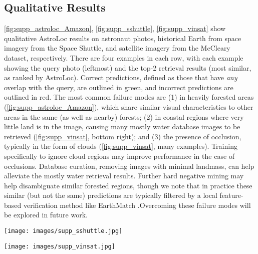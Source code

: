 \subsection{Qualitative Results}
\label{sec:supp_qualitatives}
\cref{fig:supp_astroloc_Amazon}, \ref{fig:supp_sshuttle}, \ref{fig:supp_vinsat} show qualitative AstroLoc results on astronaut photos, historical Earth from space imagery from the Space Shuttle, and satellite imagery from the McCleary\cite{McCleary_2024_vinsat} dataset, respectively. There are four examples in each row, with each example showing the query photo (leftmost) and the top-2 retrieval results (\ie most similar, as ranked by AstroLoc). Correct predictions, defined as those that have \textit{any} overlap with the query, are outlined in green, and incorrect predictions are outlined in red. 
The most common failure modes are (1) in heavily forested areas (\cref{fig:supp_astroloc_Amazon}), which share similar visual characteristics to other areas in the same (as well as nearby) forests; (2) in coastal regions where very little land is in the image, causing many mostly water database images to be retrieved (\cref{fig:supp_vinsat}, bottom right); and (3) the presence of occlusion, typically in the form of clouds (\cref{fig:supp_vinsat}, many examples). Training specifically to ignore cloud regions may improve performance in the case of occlusions. Database curation, removing images with minimal landmass, can help alleviate the mostly water retrieval results. Further hard negative mining may help disambiguate similar forested regions, though we note that in practice these similar (but not the same) predictions are typically filtered by a local feature-based verification method like EarthMatch \cite{Berton_2024_EarthMatch}.Overcoming these failure modes will be explored in future work.


\begin{figure*}
    \begin{center}
    \texttt{[image: images/supp\_sshuttle.jpg]}
    \end{center}
    \caption{\textbf{Qualitative examples from the historical Space Shuttle imagery.} Each triplet shows one query and its top-2 predictions, red if wrong and green if correct. The queries were taken with analog cameras between 1981 and 1984 and then later digitized.}
    \label{fig:supp_sshuttle}
\end{figure*}

\begin{figure*}
    \begin{center}
    \texttt{[image: images/supp\_vinsat.jpg]}
    \end{center}
    \caption{\textbf{Qualitative examples from the VINSat dataset \cite{McCleary_2024_vinsat}.} Each triplet shows one query and its top-2 predictions, red if wrong and green if correct. Queries are mosaics of Sentinel 2 imagery.}
    \label{fig:supp_vinsat}
\end{figure*}

